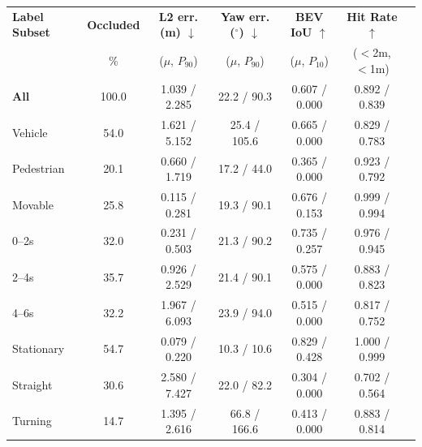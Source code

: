 \begin{tabular}{lcccccc}
\toprule
\textbf{Label Subset} & \textbf{Occluded} & \textbf{L2 err. (m) $\downarrow$} & \textbf{Yaw err. ($^\circ$) $\downarrow$} & \textbf{BEV IoU $\uparrow$} & \textbf{Hit Rate $\uparrow$} \\
 & \% & ($\mu$, $P_{90}$) & ($\mu$, $P_{90}$) & ($\mu$, $P_{10}$) & ($<$2m, $<$1m) \\
\midrule \midrule
\textbf{All} & 100.0 & 1.039 / 2.285 & 22.2 / 90.3 & 0.607 / 0.000 & 0.892 / 0.839 \\
\midrule
Vehicle & 54.0 & 1.621 / 5.152 & 25.4 / 105.6 & 0.665 / 0.000 & 0.829 / 0.783 \\
Pedestrian & 20.1 & 0.660 / 1.719 & 17.2 / 44.0 & 0.365 / 0.000 & 0.923 / 0.792 \\
Movable & 25.8 & 0.115 / 0.281 & 19.3 / 90.1 & 0.676 / 0.153 & 0.999 / 0.994 \\
\midrule
0--2s & 32.0 & 0.231 / 0.503 & 21.3 / 90.2 & 0.735 / 0.257 & 0.976 / 0.945 \\
2--4s & 35.7 & 0.926 / 2.529 & 21.4 / 90.1 & 0.575 / 0.000 & 0.883 / 0.823 \\
4--6s & 32.2 & 1.967 / 6.093 & 23.9 / 94.0 & 0.515 / 0.000 & 0.817 / 0.752 \\
\midrule
Stationary & 54.7 & 0.079 / 0.220 & 10.3 / 10.6 & 0.829 / 0.428 & 1.000 / 0.999 \\
Straight & 30.6 & 2.580 / 7.427 & 22.0 / 82.2 & 0.304 / 0.000 & 0.702 / 0.564 \\
Turning & 14.7 & 1.395 / 2.616 & 66.8 / 166.6 & 0.413 / 0.000 & 0.883 / 0.814 \\
\bottomrule
\end{tabular}
